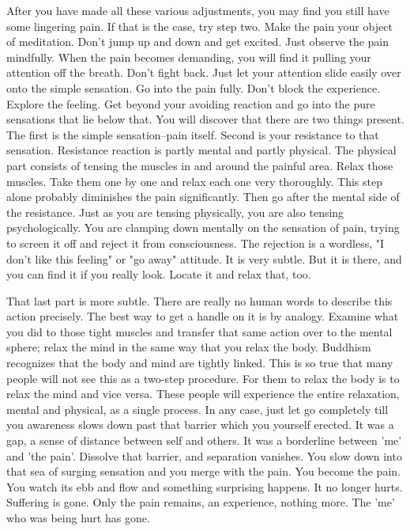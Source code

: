 After you have made all these various adjustments, you may find you still have
some lingering pain. If that is the case, try step two. Make the pain your
object of meditation. Don't jump up and down and get excited. Just observe the
pain mindfully. When the pain becomes demanding, you will find it pulling your
attention off the breath. Don't fight back. Just let your attention slide easily
over onto the simple sensation. Go into the pain fully. Don't block the
experience. Explore the feeling. Get beyond your avoiding reaction and go into
the pure sensations that lie below that. You will discover that there are two
things present. The first is the simple sensation--pain itself. Second is your
resistance to that sensation. Resistance reaction is partly mental and partly
physical. The physical part consists of tensing the muscles in and around the
painful area. Relax those muscles. Take them one by one and relax each one very
thoroughly. This step alone probably diminishes the pain significantly. Then go
after the mental side of the resistance. Just as you are tensing physically, you
are also tensing psychologically. You are clamping down mentally on the
sensation of pain, trying to screen it off and reject it from consciousness. The
rejection is a wordless, "I don't like this feeling" or "go away" attitude. It
is very subtle. But it is there, and you can find it if you really look. Locate
it and relax that, too.

That last part is more subtle. There are really no human words to describe this
action precisely. The best way to get a handle on it is by analogy. Examine what
you did to those tight muscles and transfer that same action over to the mental
sphere; relax the mind in the same way that you relax the body. Buddhism
recognizes that the body and mind are tightly linked. This is so true that many
people will not see this as a two-step procedure. For them to relax the body is
to relax the mind and vice versa. These people will experience the entire
relaxation, mental and physical, as a single process. In any case, just let go
completely till you awareness slows down past that barrier which you yourself
erected. It was a gap, a sense of distance between self and others. It was a
borderline between 'me' and 'the pain'. Dissolve that barrier, and separation
vanishes. You slow down into that sea of surging sensation and you merge with
the pain. You become the pain. You watch its ebb and flow and something
surprising happens. It no longer hurts. Suffering is gone. Only the pain
remains, an experience, nothing more. The 'me' who was being hurt has gone.

